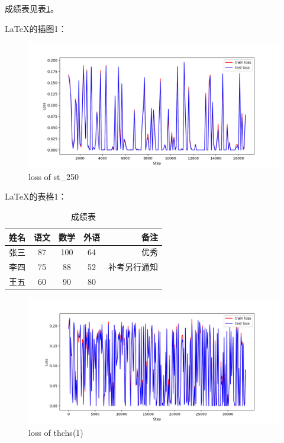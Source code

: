 \documentclass{ctexart}
\begin{document}
    成绩表见表\ref{table1}。

    \LaTeX{}的插图1：
    \begin{figure}[htbp]
        \centering
        \includegraphics[scale=0.3]{st_250}
        \caption{loss of st\_250}
    \end{figure}
    

    \LaTeX{}的表格1：
    \begin{table}[h]
        \centering
        \caption{成绩表}\label{table1}
        \begin{tabular}{|l|c|c|c|r|}
            \hline
            姓名 & 语文 & 数学 & 外语 & 备注 \\
            \hline
            张三 & 87 & 100 & 64 & 优秀 \\
            \hline
            李四 & 75 & 88 & 52 & 补考另行通知 \\
            \hline
            王五 & 60 & 90 & 80 & \\
            \hline
        \end{tabular}
    \end{table}
    
    \begin{figure}[h]
        \centering
        \includegraphics[scale=0.3]{thchs(1).png}
        \caption{loss of thchs(1)}
    \end{figure}
\end{document}
